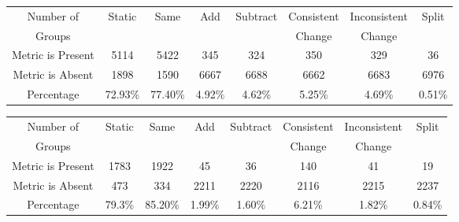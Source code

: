 \begin{table}[htbp]
\vspace{0.5em}\centering\wuhao
\begin{tabular}{cccccccc}
\toprule[1.5pt]
Number of&\multirow{2}{*}{Static}&\multirow{2}{*}{Same}&\multirow{2}{*}{Add}&\multirow{2}{*}{Subtract}&Consistent&Inconsistent&\multirow{2}{*}{Split}\\ 
Groups&&&&&Change&Change&\\ 
\midrule[1pt]
Metric is Present	&5114	&5422	&345	&324	&350	&329	&36\\ 
Metric is Absent	&1898	&1590	&6667	&6688	&6662	&6683	&6976\\ 
Percentage	&72.93\%	&77.40\%	&4.92\%	&4.62\%	&5.25\%	&4.69\%	&0.51\%\\ 
\bottomrule[1.5pt]
\end{tabular}
\end{table}

\begin{table}[htbp]
\vspace{0.5em}\centering\wuhao
\begin{tabular}{cccccccc}
\toprule[1.5pt]
Number of&\multirow{2}{*}{Static}&\multirow{2}{*}{Same}&\multirow{2}{*}{Add}&\multirow{2}{*}{Subtract}&Consistent&Inconsistent&\multirow{2}{*}{Split}\\ 
Groups&&&&&Change&Change&\\ 
\midrule[1pt]
Metric is Present	&1783	&1922	&45	&36	&140	&41	&19\\ 
Metric is Absent	&473	&334	&2211	&2220	&2116	&2215	&2237\\ 
Percentage	&79.3\%	&85.20\%	&1.99\%	&1.60\%	&6.21\%	&1.82\%	&0.84\%\\ 
\bottomrule[1.5pt]
\end{tabular}
\end{table}


